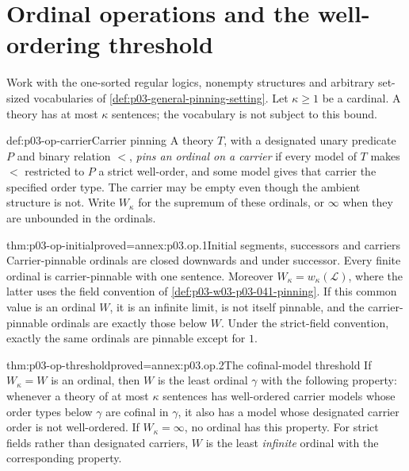 \section{Ordinal operations and the well-ordering threshold}
\label{sec:p03-ordinal-pinning}

Work with the one-sorted regular logics, nonempty structures and
arbitrary set-sized vocabularies of
\cref{def:p03-general-pinning-setting}. Let \(\kappa\geq1\)
be a cardinal. A theory has at most \(\kappa\) sentences; the
vocabulary is not subject to this bound.

\begin{hbdefinition}{def:p03-op-carrier}{Carrier pinning}
A theory \(T\), with a designated unary predicate \(P\) and binary
relation \(<\), \emph{pins an ordinal on a carrier} if every model
of \(T\) makes \(<\) restricted to \(P\) a strict well-order,
and some model gives that carrier the specified order type.
The carrier may be empty even though the ambient structure is not.
Write \(W_\kappa\) for the supremum of these ordinals, or
\(\infty\) when they are unbounded in the ordinals.
\end{hbdefinition}

\begin{hbtheorem}{thm:p03-op-initial}{proved=annex:p03.op.1}{Initial segments, successors and carriers}
Carrier-pinnable ordinals are closed downwards and under successor.
Every finite ordinal is carrier-pinnable with one sentence.
Moreover \(W_\kappa=w_\kappa(\mathscr L)\), where the latter
uses the field convention of \cref{def:p03-w03-p03-041-pinning}.
If this common value is an ordinal \(W\), it is an infinite limit,
is not itself pinnable, and the carrier-pinnable ordinals are
exactly those below \(W\). Under the strict-field convention,
exactly the same ordinals are pinnable except for \(1\).
\end{hbtheorem}

\begin{hbtheorem}{thm:p03-op-threshold}{proved=annex:p03.op.2}{The cofinal-model threshold}
If \(W_\kappa=W\) is an ordinal, then \(W\) is the least ordinal
\(\gamma\) with the following property: whenever a theory of at
most \(\kappa\) sentences has well-ordered carrier models whose
order types below \(\gamma\) are cofinal in \(\gamma\), it also
has a model whose designated carrier order is not well-ordered.
If \(W_\kappa=\infty\), no ordinal has this property.
For strict fields rather than designated carriers, \(W\) is the
least \emph{infinite} ordinal with the corresponding property.
\end{hbtheorem}

